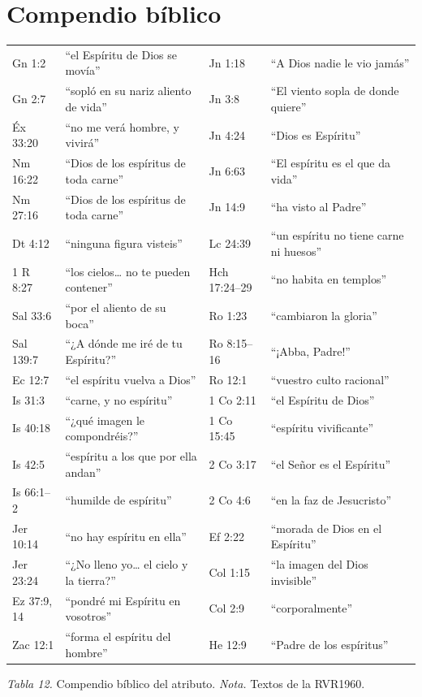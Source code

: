 \documentclass[11pt,letterpaper]{article}
\begin{document}
\section*{Compendio bíblico}
\begin{center}\small\renewcommand{\arraystretch}{1.12}
\begin{tabular}{@{}L{2.2cm}L{5.0cm}|L{2.2cm}L{5.0cm}@{}}
\toprule
Gn 1:2 & ``el Espíritu de Dios se movía'' & Jn 1:18 & ``A Dios nadie le vio jamás'' \\
Gn 2:7 & ``sopló en su nariz aliento de vida'' & Jn 3:8 & ``El viento sopla de donde quiere'' \\
Éx 33:20 & ``no me verá hombre, y vivirá'' & Jn 4:24 & ``Dios es Espíritu'' \\
Nm 16:22 & ``Dios de los espíritus de toda carne'' & Jn 6:63 & ``El espíritu es el que da vida'' \\
Nm 27:16 & ``Dios de los espíritus de toda carne'' & Jn 14:9 & ``ha visto al Padre'' \\
Dt 4:12 & ``ninguna figura visteis'' & Lc 24:39 & ``un espíritu no tiene carne ni huesos'' \\
1 R 8:27 & ``los cielos\ldots{} no te pueden contener'' & Hch 17:24--29 & ``no habita en templos'' \\
Sal 33:6 & ``por el aliento de su boca'' & Ro 1:23 & ``cambiaron la gloria'' \\
Sal 139:7 & ``¿A dónde me iré de tu Espíritu?'' & Ro 8:15--16 & ``¡Abba, Padre!'' \\
Ec 12:7 & ``el espíritu vuelva a Dios'' & Ro 12:1 & ``vuestro culto racional'' \\
Is 31:3 & ``carne, y no espíritu'' & 1 Co 2:11 & ``el Espíritu de Dios'' \\
Is 40:18 & ``¿qué imagen le compondréis?'' & 1 Co 15:45 & ``espíritu vivificante'' \\
Is 42:5 & ``espíritu a los que por ella andan'' & 2 Co 3:17 & ``el Señor es el Espíritu'' \\
Is 66:1--2 & ``humilde de espíritu'' & 2 Co 4:6 & ``en la faz de Jesucristo'' \\
Jer 10:14 & ``no hay espíritu en ella'' & Ef 2:22 & ``morada de Dios en el Espíritu'' \\
Jer 23:24 & ``¿No lleno yo\ldots{} el cielo y la tierra?'' & Col 1:15 & ``la imagen del Dios invisible'' \\
Ez 37:9, 14 & ``pondré mi Espíritu en vosotros'' & Col 2:9 & ``corporalmente'' \\
Zac 12:1 & ``forma el espíritu del hombre'' & He 12:9 & ``Padre de los espíritus'' \\
\bottomrule
\end{tabular}\par
{\footnotesize\color{gris}\textit{Tabla 12.} Compendio bíblico del atributo. \textit{Nota.} Textos de la RVR1960.}
\end{center}
\end{document}
